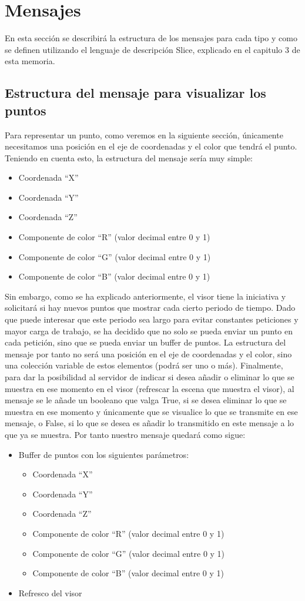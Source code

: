 \section{Mensajes}
En esta sección se describirá la estructura de los mensajes para cada tipo y como se definen utilizando el lenguaje de descripción Slice, explicado en el capitulo 3 de esta memoria.
\subsection{Estructura del mensaje para visualizar los puntos}
Para representar un punto, como veremos en la siguiente sección, únicamente necesitamos una posición en el eje de coordenadas y el color que tendrá el punto. Teniendo en cuenta esto, la estructura del mensaje sería muy simple:
\begin{itemize}
\item Coordenada ``X''
\item Coordenada ``Y''
\item Coordenada ``Z''
\item Componente de color ``R'' (valor decimal entre 0 y 1)
\item Componente de color ``G'' (valor decimal entre 0 y 1)
\item Componente de color ``B'' (valor decimal entre 0 y 1)
\end{itemize}
Sin embargo, como se ha explicado anteriormente, el visor tiene la iniciativa y solicitará si hay nuevos puntos que mostrar cada cierto periodo de tiempo. Dado que puede interesar que este periodo sea largo para evitar constantes peticiones y mayor carga de trabajo, se ha decidido que no solo se pueda enviar un punto en cada petición, sino que se pueda enviar un buffer de puntos. La estructura del mensaje por tanto no será una posición en el eje de coordenadas y el color, sino una colección variable de estos elementos (podrá ser uno o más).
Finalmente, para dar la posibilidad al servidor de indicar si desea añadir o eliminar lo que se muestra en ese momento en el visor (refrescar la escena que muestra el visor), al mensaje se le añade un booleano que valga True, si se desea eliminar lo que se muestra en ese momento y únicamente que se visualice lo que se transmite en ese mensaje, o False, si lo que se desea es añadir lo transmitido en este mensaje a lo que ya se muestra.
Por tanto nuestro mensaje quedará como sigue:
\begin{itemize}
\item Buffer de puntos con los siguientes parámetros:
	\begin{itemize}
	\item Coordenada ``X''
	\item Coordenada ``Y''
	\item Coordenada ``Z''
	\item Componente de color ``R'' (valor decimal entre 0 y 1)
	\item Componente de color ``G'' (valor decimal entre 0 y 1)
	\item Componente de color ``B'' (valor decimal entre 0 y 1)
	\end{itemize}
\item Refresco del visor
\end{itemize}


